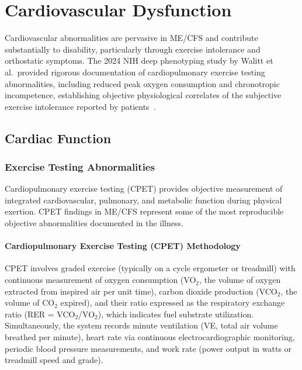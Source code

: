 \chapter{Cardiovascular Dysfunction}
\label{ch:cardiovascular}

Cardiovascular abnormalities are pervasive in ME/CFS and contribute substantially to disability, particularly through exercise intolerance and orthostatic symptoms. The 2024 NIH deep phenotyping study by Walitt et al.\ provided rigorous documentation of cardiopulmonary exercise testing abnormalities, including reduced peak oxygen consumption and chronotropic incompetence, establishing objective physiological correlates of the subjective exercise intolerance reported by patients~\cite{walitt2024deep}.

\section{Cardiac Function}
\label{sec:cardiac-function}

\subsection{Exercise Testing Abnormalities}
\label{sec:exercise-testing}

Cardiopulmonary exercise testing (CPET) provides objective measurement of integrated cardiovascular, pulmonary, and metabolic function during physical exertion. CPET findings in ME/CFS represent some of the most reproducible objective abnormalities documented in the illness.

\subsubsection{Cardiopulmonary Exercise Testing (CPET) Methodology}

CPET involves graded exercise (typically on a cycle ergometer or treadmill) with continuous measurement of oxygen consumption (VO$_2$, the volume of oxygen extracted from inspired air per unit time), carbon dioxide production (VCO$_2$, the volume of CO$_2$ expired), and their ratio expressed as the respiratory exchange ratio (RER = VCO$_2$/VO$_2$), which indicates fuel substrate utilization. Simultaneously, the system records minute ventilation (VE, total air volume breathed per minute), heart rate via continuous electrocardiographic monitoring, periodic blood pressure measurements, and work rate (power output in watts or treadmill speed and grade).

